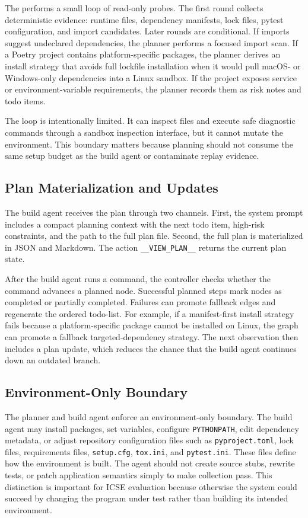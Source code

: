 The \planner performs a small loop of read-only probes.
The first round collects deterministic evidence: runtime files, dependency manifests, lock files, pytest configuration, and import candidates.
Later rounds are conditional.
If imports suggest undeclared dependencies, the planner performs a focused import scan.
If a Poetry project contains platform-specific packages, the planner derives an install strategy that avoids full lockfile installation when it would pull macOS- or Windows-only dependencies into a Linux sandbox.
If the project exposes service or environment-variable requirements, the planner records them as risk notes and todo items.

The loop is intentionally limited.
It can inspect files and execute safe diagnostic commands through a sandbox inspection interface, but it cannot mutate the environment.
This boundary matters because planning should not consume the same setup budget as the build agent or contaminate replay evidence.

\subsection{Plan Materialization and Updates}

The build agent receives the plan through two channels.
First, the system prompt includes a compact planning context with the next todo item, high-risk constraints, and the path to the full plan file.
Second, the full plan is materialized in JSON and Markdown.
The action \texttt{\_\_VIEW\_PLAN\_\_} returns the current plan state.

After the build agent runs a command, the controller checks whether the command advances a planned node.
Successful planned steps mark nodes as completed or partially completed.
Failures can promote fallback edges and regenerate the ordered todo-list.
For example, if a manifest-first install strategy fails because a platform-specific package cannot be installed on Linux, the graph can promote a fallback targeted-dependency strategy.
The next observation then includes a plan update, which reduces the chance that the build agent continues down an outdated branch.

\subsection{Environment-Only Boundary}

The planner and build agent enforce an environment-only boundary.
The build agent may install packages, set variables, configure \texttt{PYTHONPATH}, edit dependency metadata, or adjust repository configuration files such as \texttt{pyproject.toml}, lock files, requirements files, \texttt{setup.cfg}, \texttt{tox.ini}, and \texttt{pytest.ini}.
These files define how the environment is built.
The agent should not create source stubs, rewrite tests, or patch application semantics simply to make collection pass.
This distinction is important for ICSE evaluation because otherwise the system could succeed by changing the program under test rather than building its intended environment.

